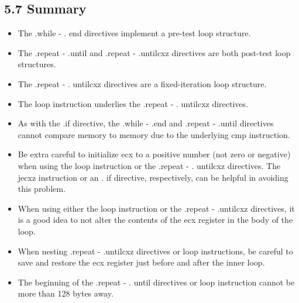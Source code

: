 \documentclass[10pt]{article}
\begin{document}
\subsection*{5.7 Summary}
\begin{itemize}
  \item The .while - . end directives implement a pre-test loop structure.
  \item The .repeat - .until and .repeat - .untilcxz directives are both post-test loop structures.
  \item The .repeat - . untilcxz directives are a fixed-iteration loop structure.
  \item The loop instruction underlies the .repeat - . untilcxz directives.
  \item As with the .if directive, the .while - .end and .repeat - .until directives cannot compare memory to memory due to the underlying cmp instruction.
  \item Be extra careful to initialize ecx to a positive number (not zero or negative) when using the loop instruction or the .repeat - . untilcxz directives. The jecxz instruction or an . if directive, respectively, can be helpful in avoiding this problem.
  \item When using either the loop instruction or the .repeat - .untilcxz directives, it is a good idea to not alter the contents of the ecx register in the body of the loop.
  \item When nesting .repeat - .untilcxz directives or loop instructions, be careful to save and restore the ecx register just before and after the inner loop.
  \item The beginning of the .repeat - . until directives or loop instruction cannot be more than 128 bytes away.
\end{itemize}
\end{document}
